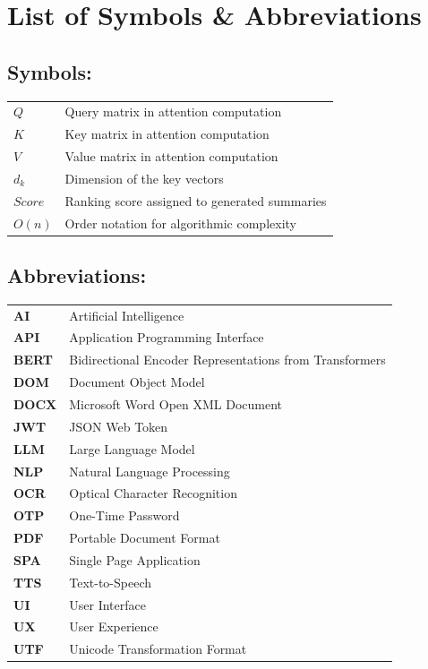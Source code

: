 \documentclass[12pt, a4paper]{report}
\begin{document}
\chapter*{List of Symbols \& Abbreviations}
\vspace{-1.5cm}
\section*{Symbols:}
\begin{longtable}{p{3cm} p{11cm}}
  $Q$ & Query matrix in attention computation \\
  $K$ & Key matrix in attention computation \\
  $V$ & Value matrix in attention computation \\
  $d_k$ & Dimension of the key vectors \\
  $Score$ & Ranking score assigned to generated summaries \\
  $O(n)$ & Order notation for algorithmic complexity \\
\end{longtable}

\section*{Abbreviations:}
\begin{longtable}{p{3cm} p{11cm}}
  \textbf{AI} & Artificial Intelligence \\
  \textbf{API} & Application Programming Interface \\
  \textbf{BERT} & Bidirectional Encoder Representations from Transformers \\
  \textbf{DOM} & Document Object Model \\
  \textbf{DOCX} & Microsoft Word Open XML Document \\
  \textbf{JWT} & JSON Web Token \\
  \textbf{LLM} & Large Language Model \\
  \textbf{NLP} & Natural Language Processing \\
  \textbf{OCR} & Optical Character Recognition \\
  \textbf{OTP} & One-Time Password \\
  \textbf{PDF} & Portable Document Format \\
  \textbf{SPA} & Single Page Application \\
  \textbf{TTS} & Text-to-Speech \\
  \textbf{UI} & User Interface \\
  \textbf{UX} & User Experience \\
  \textbf{UTF} & Unicode Transformation Format \\
\end{longtable}
\end{document}
